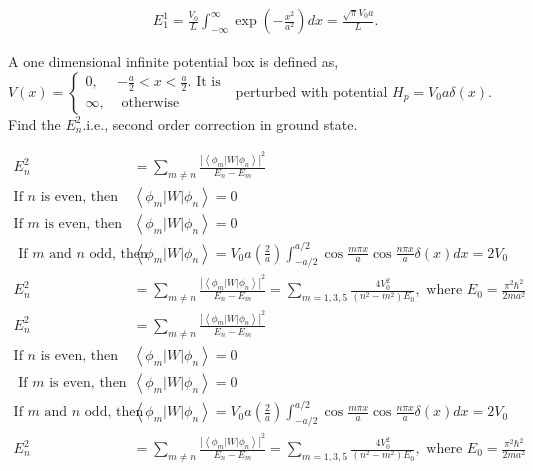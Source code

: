 \begin{enumerate}
\begin{answer}
\begin{align*}
  	&E_{1}^{1}=\frac{V_{0}}{L} \int_{-\infty}^{\infty} \exp \left(-\frac{x^{2}}{a^{2}}\right) d x=\frac{\sqrt{\pi} V_{0} a}{L} .
  \end{align*}
 \end{answer}
	\begin{minipage}{\textwidth}
	\item A one dimensional infinite potential box is defined as, $V(x)= \begin{cases}0, & -\frac{a}{2}<x<\frac{a}{2} . \text { It is } \\ \infty, & \text { otherwise }\end{cases}$ perturbed with potential $H_{p}=V_{0} a \delta(x)$. Find the $E_{n}^{2}$.i.e., second order correction in ground state.
\end{minipage}
\begin{answer}
	\begin{align*}
		E_{n}^{2}&=\sum_{m \neq n} \frac{\left|\left\langle\phi_{m}|W| \phi_{n}\right\rangle\right|^{2}}{E_{n}-E_{m}}\\
	\text{If $n$ is even, then }&\left\langle\phi_{m}|W| \phi_{n}\right\rangle=0\\
	\text{If $m$ is even, then }&\left\langle\phi_{m}|W| \phi_{n}\right\rangle=0\\
\text{	If $m$ and $n$ odd, then }&\left\langle\phi_{m}|W| \phi_{n}\right\rangle=V_{0} a\left(\frac{2}{a}\right)\int_{-a / 2}^{a / 2} \cos \frac{m \pi x}{a} \cos \frac{n \pi x}{a} \delta(x) d x=2 V_{0}\\
	E_{n}^{2}&=\sum_{m \neq n} \frac{\left|\left\langle\phi_{m}|W| \phi_{n}\right\rangle\right|^{2}}{E_{n}-E_{m}}=\sum_{m=1,3,5} \frac{4 V_{0}^{2}}{\left(n^{2}-m^{2}\right) E_{0}}, \text { where } E_{0}=\frac{\pi^{2} \hbar^{2}}{2 m a^{2}}\\
		E_{n}^{2}&=\sum_{m \neq n} \frac{\left|\left\langle\phi_{m}|W| \phi_{n}\right\rangle\right|^{2}}{E_{n}-E_{m}}\\
	\text{If $n$ is even, then }&\left\langle\phi_{m}|W| \phi_{n}\right\rangle=0\\
\text{	If $m$ is even, then }&\left\langle\phi_{m}|W| \phi_{n}\right\rangle=0\\
	\text{If $m$ and $n$ odd, then }&\left\langle\phi_{m}|W| \phi_{n}\right\rangle=V_{0} a\left(\frac{2}{a}\right)\int_{-a / 2}^{a / 2} \cos \frac{m \pi x}{a} \cos \frac{n \pi x}{a} \delta(x) d x=2 V_{0}\\
	E_{n}^{2}&=\sum_{m \neq n} \frac{\left|\left\langle\phi_{m}|W| \phi_{n}\right\rangle\right|^{2}}{E_{n}-E_{m}}=\sum_{m=1,3,5} \frac{4 V_{0}^{2}}{\left(n^{2}-m^{2}\right) E_{0}}, \text { where } E_{0}=\frac{\pi^{2} \hbar^{2}}{2 m a^{2}}\\

\end{align*}
\end{answer}
\end{enumerate}
